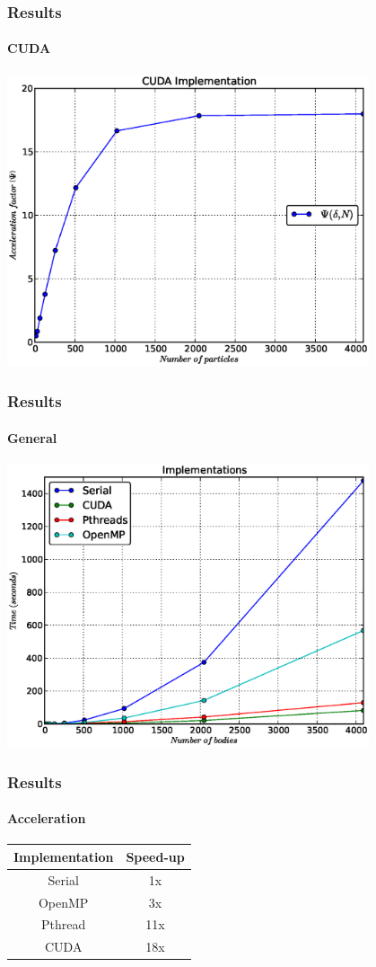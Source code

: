 \frame
{
\frametitle{Results}
\framesubtitle{CUDA}
\begin{center}
    \includegraphics[width=0.8\textwidth]{img/cuda}
\end{center}
}

\frame
{
\frametitle{Results}
\framesubtitle{General}
\begin{center}
    \includegraphics[width=0.8\textwidth]{img/all}
\end{center}
}

\frame
{
\frametitle{Results}
\framesubtitle{Acceleration}
\begin{center}
    \begin{tabular}{|c|c|}
        \hline
        \textbf{Implementation} & \textbf{Speed-up} \\\hline
        Serial  & 1x  \\\hline
        OpenMP  & 3x  \\\hline
        Pthread & 11x \\\hline
        CUDA    & 18x \\\hline
    \end{tabular}
\end{center}
}


